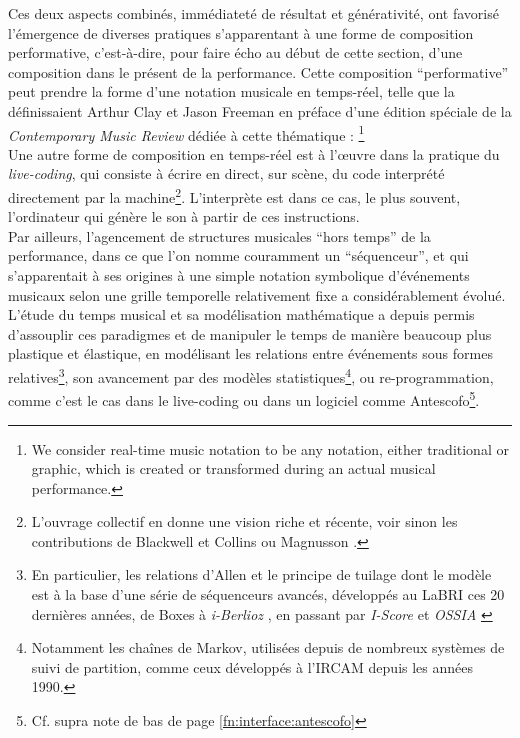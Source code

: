 \indent Ces deux aspects combinés, immédiateté de résultat et générativité, ont favorisé l'émergence de diverses pratiques s'apparentant à une forme de composition performative, c'est-à-dire, pour faire écho au début de cette section, d'une composition dans le présent de la performance. Cette composition ``performative'' peut prendre la forme d'une notation musicale en temps-réel, telle que la définissaient Arthur Clay et Jason Freeman en préface d'une édition spéciale de la \textit{Contemporary Music Review} dédiée à cette thématique \cite{clay_preface_2010}: \footnote{We consider real-time music notation to be any notation, either traditional or graphic, which is created or transformed during an actual musical performance.}\\
\indent Une autre forme de composition en temps-réel est à l'œuvre dans la pratique du \textit{live-coding}, qui consiste à écrire en direct, sur scène, du code interprété directement par la machine\footnote{L'ouvrage collectif \cite{mclean_oxford_2018} en donne une vision riche et récente, voir sinon les contributions de Blackwell et Collins \cite{blackwell_programming_2005} ou Magnusson \cite{magnusson_algorithms_2011}.}. L'interprète est dans ce cas, le plus souvent, l'ordinateur qui génère le son à partir de ces instructions.\\
\indent Par ailleurs, l'agencement de structures musicales ``hors temps'' de la performance, dans ce que l'on nomme couramment un ``séquenceur'', et qui s'apparentait à ses origines à une simple notation symbolique d'événements musicaux selon une grille temporelle relativement fixe a considérablement évolué. L'étude du temps musical et sa modélisation mathématique a depuis permis d'assouplir ces paradigmes et de manipuler le temps de manière beaucoup plus plastique et élastique, en modélisant les relations entre événements sous formes relatives\footnote{En particulier, les relations d'Allen et le principe de tuilage \cite{berthaut_libtuile_2013} dont le modèle est à la base d'une série de séquenceurs avancés, développés au \gls{LaBRI} ces 20 dernières années, de Boxes à \textit{i-Berlioz} \cite{miranda_i-berlioz:_2019}, en passant par \textit{I-Score} \cite{desainte-catherine_interactive_2005} et \textit{OSSIA} \cite{celerier_ossia:_2015}}, son avancement par des modèles statistiques\footnote{Notamment les chaînes de Markov, utilisées depuis de nombreux systèmes de suivi de partition, comme ceux développés à l'\gls{IRCAM} depuis les années 1990.}, ou re-programmation, comme c'est le cas dans le live-coding ou dans un logiciel comme Antescofo\footnote{Cf. supra note de bas de page \ref{fn:interface:antescofo}}.\\
